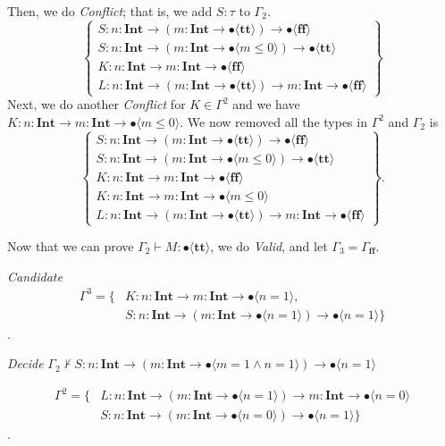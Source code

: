\documentclass[runningheads]{llncs}
\newcommand\COL{\mathbin{:}}
\newcommand \true {\textbf{tt}}
\newcommand \false {\textbf{ff}}
\newcommand \stypeint {\textbf{Int}}
\newcommand \stypebool {\bullet}
\newcommand \typeint[1]{{#1} : \stypeint}
\newcommand \typebool[1]{\stypebool \langle #1 \rangle}
\newcommand {\rdecide} {\emph{Decide}}
\newcommand {\rconflict} {\emph{Conflict}}
\newcommand {\rvalid} {\emph{Valid}}
\newcommand {\rcandidate} {\emph{Candidate}}
\begin{document}
Then, we do \rconflict{}; that is, we add \( S \COL \tau \) to \( \Gamma_2 \).
\[
    \left\{
    \begin{array}{l}
        S \COL \typeint{n} \to(\typeint{m} \to \typebool{\true}) \to
        \typebool{\false}\\
        S \COL \typeint{n} \to(\typeint{m} \to \typebool{m \leq 0}) \to
        \typebool{\true}\\
        K \COL \typeint{n} \to \typeint{m} \to \typebool{\false}\\
        L \COL \typeint{n} \to (\typeint{m} \to \typebool{\true}) \to
        \typeint{m} \to \typebool{\false}
    \end{array}
    \right\}
\]
Next, we do another \rconflict{} for \( K \in \Gamma^2 \) and
we have \( K \COL \typeint{n} \to \typeint{m} \to \typebool{m \leq 0} \).
We now removed all the types in \( \Gamma^2 \) and \( \Gamma_2 \) is
\[
    \left\{
    \begin{array}{l}
        S \COL \typeint{n} \to(\typeint{m} \to \typebool{\true}) \to
        \typebool{\false}\\
        S \COL \typeint{n} \to (\typeint{m} \to \typebool{m \leq 0}) \to
        \typebool{\true}\\
        K \COL \typeint{n} \to \typeint{m} \to \typebool{\false}\\
        K \COL \typeint{n} \to \typeint{m} \to \typebool{m \leq 0}\\
        L \COL \typeint{n} \to (\typeint{m} \to \typebool{\true}) \to
        \typeint{m} \to \typebool{\false}
    \end{array}
    \right\}.
\]

Now that we can prove \( \Gamma_2 \vdash M \COL \typebool{\true} \), we do
\rvalid{}, and let \( \Gamma_3 = \Gamma_\false \).

\rcandidate{}
\begin{align*} \Gamma^3 = \{
    &K \COL \typeint{n} \to \typeint{m} \to \typebool{n = 1},\\
&S \COL \typeint{n} \to (\typeint{m} \to
\typebool{n = 1}) \to \typebool{n = 1} \}
\end{align*}.

\rdecide{}
\( \Gamma_2 \not \vdash S \COL \typeint{n} \to (\typeint{m} \to
\typebool{m = 1 \land n = 1}) \to \typebool{n = 1} \)

\begin{align*} \Gamma^2 = \{
        &L \COL \typeint{n} \to (\typeint{m} \to \typebool{n = 1}) \to
        \typeint{m} \to \typebool{n = 0}\\
    &S \COL \typeint{n} \to (\typeint{m} \to \typebool{n = 0}) \to \typebool{n = 1} \}
\end{align*}.
\end{document}
